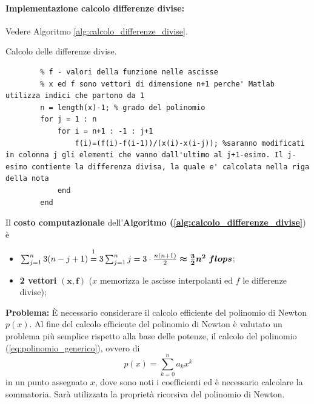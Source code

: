 \paragraph{Implementazione calcolo differenze divise:} Vedere Algoritmo \ref{alg:calcolo_differenze_divise}.

\begin{algorithm}
\caption{Calcolo delle differenze divise.}\label{alg:calcolo_differenze_divise}
    \begin{lstlisting}[style=Matlab-editor]
        % x - ascisse di interpolazione
        % f - valori della funzione nelle ascisse
        % x ed f sono vettori di dimensione n+1 perche' Matlab utilizza indici che partono da 1
        n = length(x)-1; % grado del polinomio
        for j = 1 : n
            for i = n+1 : -1 : j+1
                f(i)=(f(i)-f(i-1))/(x(i)-x(i-j)); %saranno modificati in colonna j gli elementi che vanno dall'ultimo al j+1-esimo. Il j-esimo contiente la differenza divisa, la quale e' calcolata nella riga della nota
            end
        end
    \end{lstlisting}
\end{algorithm}

\begin{remark} Il \textbf{costo computazionale} dell'\textbf{Algoritmo (\ref{alg:calcolo_differenze_divise}}) è
    \begin{itemize}
        \item $\sum_{j=1}^{n}3(n-j+1)\overset{\footnotemark}{=} 3\sum_{j=1}^{n}j=3\cdot\frac{n(n+1)}{2}\boldsymbol{\approx \frac{3}{2}n^2\; flops}$; 
        \item \textbf{2 vettori} $\boldsymbol{(x, f)}$ ($x$ memorizza le ascisse interpolanti ed $f$ le differenze divise);
    \end{itemize}
\end{remark}

\noindent\textbf{Problema:} È necessario considerare il calcolo efficiente del polinomio di Newton $p(x)$. Al fine del calcolo efficiente del polinomio di Newton è valutato un problema più semplice rispetto alla base delle potenze, il calcolo del polinomio (\ref{eq:polinomio_generico}), ovvero di
\begin{equation}\label{eq:polinomio_generico_ridef}
	p(x)=\sum_{k=0}^{n}a_kx^k
\end{equation}
in un punto assegnato $x$, dove sono noti i coefficienti ed è necessario calcolare la sommatoria. Sarà utilizzata la proprietà ricorsiva del polinomio di Newton.


